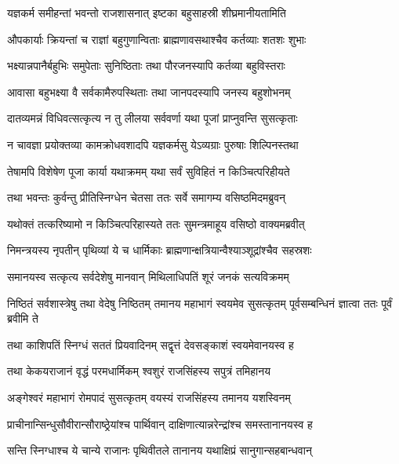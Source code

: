 \twolineshloka
{यज्ञकर्म समीहन्तां भवन्तो राजशासनात्}
{इष्टका बहुसाहस्री शीघ्रमानीयतामिति} %

\twolineshloka
{औपकार्याः क्रियन्तां च राज्ञां बहुगुणान्विताः}
{ब्राह्मणावसथाश्चैव कर्तव्याः शतशः शुभाः} %

\twolineshloka
{भक्ष्यान्नपानैर्बहुभिः समुपेताः सुनिष्ठिताः}
{तथा पौरजनस्यापि कर्तव्या बहुविस्तराः} %

\twolineshloka
{आवासा बहुभक्ष्या वै सर्वकामैरुपस्थिताः}
{तथा जानपदस्यापि जनस्य बहुशोभनम्} %

\twolineshloka
{दातव्यमन्नं विधिवत्सत्कृत्य न तु लीलया}
{सर्ववर्णा यथा पूजां प्राप्नुवन्ति सुसत्कृताः} %

\twolineshloka
{न चावज्ञा प्रयोक्तव्या कामक्रोधवशादपि}
{यज्ञकर्मसु येऽव्यग्राः पुरुषाः शिल्पिनस्तथा} %

\twolineshloka
{तेषामपि विशेषेण पूजा कार्या यथाक्रमम्}
{यथा सर्वं सुविहितं न किञ्चित्परिहीयते} %

\twolineshloka
{तथा भवन्तः कुर्वन्तु प्रीतिस्निग्धेन चेतसा}
{ततः सर्वे समागम्य वसिष्ठमिदमब्रुवन्} %

\twolineshloka
{यथोक्तं तत्करिष्यामो न किञ्चित्परिहास्यते}
{ततः सुमन्त्रमाहूय वसिष्ठो वाक्यमब्रवीत्} %

\twolineshloka
{निमन्त्रयस्य नृपतीन् पृथिव्यां ये च धार्मिकाः}
{ब्राह्मणान्क्षत्रियान्वैश्याञ्शूद्रांश्चैव सहस्रशः} %

\twolineshloka
{समानयस्व सत्कृत्य सर्वदेशेषु मानवान्}
{मिथिलाधिपतिं शूरं जनकं सत्यविक्रमम्} %

\threelineshloka
{निष्ठितं सर्वशास्त्रेषु तथा वेदेषु निष्ठितम्}
{तमानय महाभागं स्वयमेव सुसत्कृतम्}
{पूर्वसम्बन्धिनं ज्ञात्वा ततः पूर्वं ब्रवीमि ते} %

\twolineshloka
{तथा काशिपतिं स्निग्धं सततं प्रियवादिनम्}
{सद्वृत्तं देवसङ्काशं स्वयमेवानयस्व ह} %

\twolineshloka
{तथा केकयराजानं वृद्धं परमधार्मिकम्}
{श्वशुरं राजसिंहस्य सपुत्रं तमिहानय} %

\twolineshloka
{अङ्गेश्वरं महाभागं रोमपादं सुसत्कृतम्}
{वयस्यं राजसिंहस्य तमानय यशस्विनम्} %

\twolineshloka
{प्राचीनान्सिन्धुसौवीरान्सौराष्ठ्रेयांश्च पार्थिवान्}
{दाक्षिणात्यान्नरेन्द्रांश्च समस्तानानयस्व ह} %

\twolineshloka
{सन्ति स्निग्धाश्च ये चान्ये राजानः पृथिवीतले}
{तानानय यथाक्षिप्रं सानुगान्सहबान्धवान्} %

